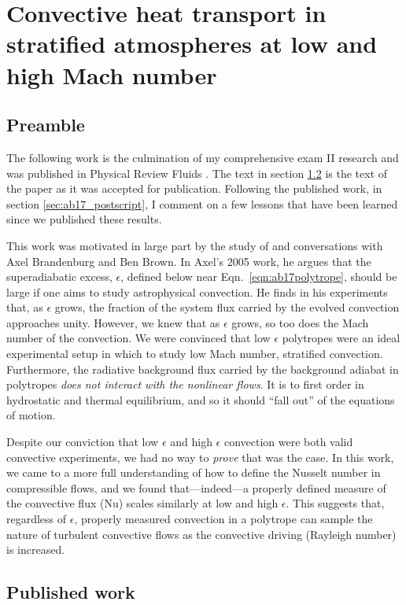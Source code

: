 \chapter{Convective heat transport in stratified atmospheres at low and high Mach number}
\label{ch:ab17}

\section{Preamble}
The following work is the culmination of my comprehensive exam II research and was published in Physical Review Fluids \citep{anders&brown2017}.
The text in section \ref{sec:ab17_published} is the text of the paper as it was accepted for publication.
Following the published work, in section \ref{sec:ab17_postscript}, I comment on a few lessons that have been learned since we published these results.

This work was motivated in large part by the study of \citet{brandenburg&all2005} and conversations with Axel Brandenburg and Ben Brown.
In Axel's 2005 work, he argues that the superadiabatic excess, $\epsilon$, defined below near Eqn.~\ref{eqn:ab17polytrope}, should be large if one aims to study astrophysical convection.
He finds in his experiments that, as $\epsilon$ grows, the fraction of the system flux carried by the evolved convection approaches unity.
However, we knew that as $\epsilon$ grows, so too does the Mach number of the convection.
We were convinced that low $\epsilon$ polytropes were an ideal experimental setup in which to study low Mach number, stratified convection.
Furthermore, the radiative background flux carried by the background adiabat in polytropes \emph{does not interact with the nonlinear flows}.
It is to first order in hydrostatic and thermal equilibrium, and so it should ``fall out'' of the equations of motion.

Despite our conviction that low $\epsilon$ and high $\epsilon$ convection were both valid convective experiments, we had no way to \emph{prove} that was the case.
In this work, we came to a more full understanding of how to define the Nusselt number in compressible flows, and we found that---indeed---a properly defined measure of the convective flux (Nu) scales similarly at low and high $\epsilon$.
This suggests that, regardless of $\epsilon$, properly measured convection in a polytrope can sample the nature of turbulent convective flows as the convective driving (Rayleigh number) is increased.


\section{Published work}
\label{sec:ab17_published}

